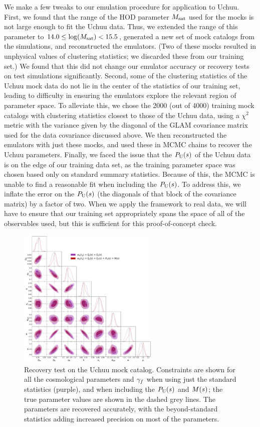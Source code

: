 We make a few tweaks to our emulation procedure for application to Uchuu.
First, we found that the range of the HOD parameter $M_\mathrm{sat}$ used for the \aemulus mocks is not large enough to fit the Uchuu data.
Thus, we extended the range of this parameter to $14.0 \leq \mathrm{log}(M_\mathrm{sat}) < 15.5$, generated a new set of mock catalogs from the \aemulus simulations, and reconstructed the emulators.
(Two of these mocks resulted in unphysical values of clustering statistics; we discarded these from our training set.)
We found that this did not change our emulator accuracy or recovery tests on \aemulus test simulations significantly. 
Second, some of the clustering statistics of the Uchuu mock data do not lie in the center of the statistics of our training set, leading to difficulty in ensuring the emulators explore the relevant region of parameter space.
To alleviate this, we chose the 2000 (out of 4000) training mock catalogs with clustering statistics closest to those of the Uchuu data, using a $\chi^2$ metric with the variance given by the diagonal of the GLAM covariance matrix used for the data covariance discussed above.
We then reconstructed the emulators with just these mocks, and used these in MCMC chains to recover the Uchuu parameters.
Finally, we faced the issue that the $P_\mathrm{U}(s)$ of the Uchuu data is on the edge of our training data set, as the training parameter space was chosen based only on standard summary statistics.
Because of this, the MCMC is unable to find a reasonable fit when including the $P_\mathrm{U}(s)$.
To address this, we inflate the error on the $P_\mathrm{U}(s)$ (the diagonals of that block of the covariance matrix) by a factor of two.
When we apply the framework to real data, we will have to ensure that our training set appropriately spans the space of all of the observables used, but this is sufficient for this proof-of-concept check.

\begin{figure}
\centering
\includegraphics[width=0.6\textwidth]{uchuu_recovery}
\caption{Recovery test on the Uchuu mock catalog. Constraints are shown for all the cosmological parameters and $\gamma_f$ when using just the standard statistics (purple), and when including the $P_\mathrm{U}(s)$ and $M(s)$; the true parameter values are shown in the dashed grey lines. The parameters are recovered accurately, with the beyond-standard statistics adding increased precision on most of the parameters.}
\label{fig:uchuu_recovery}
\end{figure}

